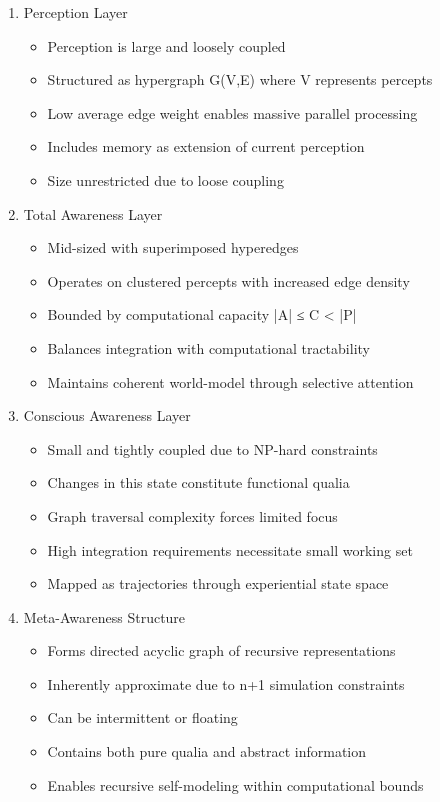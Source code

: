 \documentclass[12pt,letterpaper]{article}
\begin{document}
\begin{enumerate}
\begin{enumerate}
        \item Perception Layer
        \begin{itemize}
            \item Perception is large and loosely coupled
            \item Structured as hypergraph G(V,E) where V represents percepts
            \item Low average edge weight enables massive parallel processing
            \item Includes memory as extension of current perception
            \item Size unrestricted due to loose coupling
        \end{itemize}
        
        \item Total Awareness Layer
        \begin{itemize}
            \item Mid-sized with superimposed hyperedges
            \item Operates on clustered percepts with increased edge density
            \item Bounded by computational capacity |A| ≤ C < |P|
            \item Balances integration with computational tractability
            \item Maintains coherent world-model through selective attention
        \end{itemize}
        
        \item Conscious Awareness Layer
        \begin{itemize}
            \item Small and tightly coupled due to NP-hard constraints
            \item Changes in this state constitute functional qualia
            \item Graph traversal complexity forces limited focus
            \item High integration requirements necessitate small working set
            \item Mapped as trajectories through experiential state space
        \end{itemize}
        
        \item Meta-Awareness Structure
        \begin{itemize}
            \item Forms directed acyclic graph of recursive representations
            \item Inherently approximate due to n+1 simulation constraints
            \item Can be intermittent or floating
            \item Contains both pure qualia and abstract information
            \item Enables recursive self-modeling within computational bounds
        \end{itemize}


\end{enumerate}
\end{enumerate}
\end{document}
